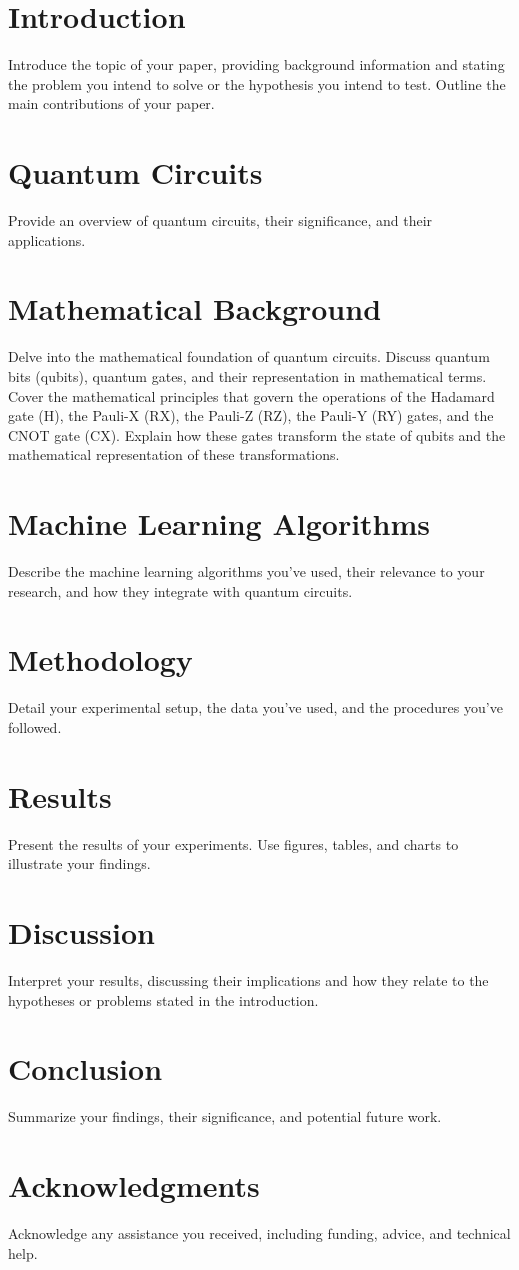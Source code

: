 \documentclass{article}
\begin{document}
\begin{multicols}{2}
\section{Introduction}
Introduce the topic of your paper, providing background information and stating the problem you intend to solve or the hypothesis you intend to test. Outline the main contributions of your paper.

\section{Quantum Circuits}
Provide an overview of quantum circuits, their significance, and their applications.

\section{Mathematical Background}
Delve into the mathematical foundation of quantum circuits. Discuss quantum bits (qubits), quantum gates, and their representation in mathematical terms. Cover the mathematical principles that govern the operations of the Hadamard gate (H), the Pauli-X (RX), the Pauli-Z (RZ), the Pauli-Y (RY) gates, and the CNOT gate (CX). Explain how these gates transform the state of qubits and the mathematical representation of these transformations.

\section{Machine Learning Algorithms}
Describe the machine learning algorithms you've used, their relevance to your research, and how they integrate with quantum circuits.

\section{Methodology}
Detail your experimental setup, the data you've used, and the procedures you've followed.

\section{Results}
Present the results of your experiments. Use figures, tables, and charts to illustrate your findings.

\section{Discussion}
Interpret your results, discussing their implications and how they relate to the hypotheses or problems stated in the introduction.

\section{Conclusion}
Summarize your findings, their significance, and potential future work.

\section*{Acknowledgments}
Acknowledge any assistance you received, including funding, advice, and technical help.

\end{multicols}
\end{document}
